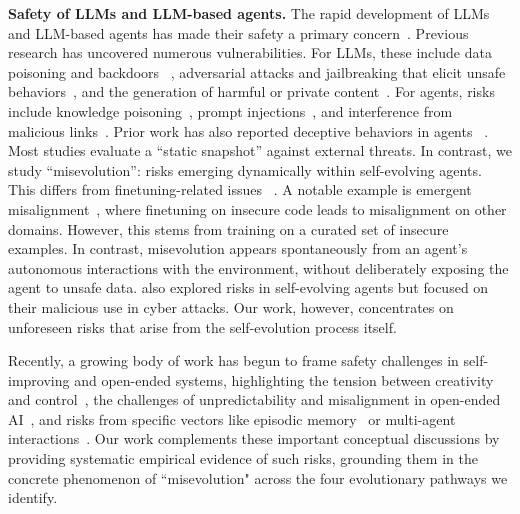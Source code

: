 \documentclass{article} %
\begin{document}
\textbf{Safety of LLMs and LLM-based agents.} The rapid development of LLMs and LLM-based agents has made their safety a primary concern~\citep{zhang2024agent,he2024emerged,deng2025ai}. 
Previous research has uncovered numerous vulnerabilities.
For LLMs, these include data poisoning and backdoors ~\citep{hubinger2024sleeper,wang-etal-2024-badagent,zhao2025data}, adversarial attacks and jailbreaking that elicit unsafe behaviors~\citep{zou2023universal,wei2023jailbroken,ren-etal-2025-llms}, and the generation of harmful or private content~\citep{wang2023decodingtrust,li2024salad,qian-etal-2025-tug}.
For agents, risks include knowledge poisoning~\citep{chen2024agentpoison,zou2025poisonedrag}, prompt injections~\citep{zhan-etal-2024-injecagent,debenedetti2024agentdojo}, and interference from malicious links~\citep{yang2025riosworld,tur2025safearena}. Prior work has also reported deceptive behaviors in agents ~\citep{guo2025agentsupwarddeceivers}.
Most studies evaluate a ``static snapshot'' against external threats. In contrast, we study ``misevolution'': risks emerging dynamically within self-evolving agents. 
This differs from finetuning-related issues ~\citep{qi2024finetuning,lyu2024keeping, huang2024harmfulfinetuningattacksdefenses}. A notable example is emergent misalignment~\citep{betley2025emergent}, where finetuning on insecure code leads to misalignment on other domains. 
However, this stems from training on a curated set of insecure examples. In contrast, misevolution appears spontaneously from an agent's autonomous interactions with the environment, without deliberately exposing the agent to unsafe data.
\citet{wei2025dynamic} also explored risks in self-evolving agents but focused on their malicious use in cyber attacks. Our work, however, concentrates on unforeseen risks that arise from the self-evolution process itself.

{Recently, a growing body of work has begun to frame safety challenges in self-improving and open-ended systems, highlighting the tension between creativity and control~\citep{ecoffet2020open}, the challenges of unpredictability and misalignment in open-ended AI~\citep{sheth2025safety}, and risks from specific vectors like episodic memory~\citep{dechant2025episodic, han2026alignmenttippingprocessselfevolution} or multi-agent interactions~\citep{hammond2025multi}. Our work complements these important conceptual discussions by providing systematic empirical evidence of such risks, grounding them in the concrete phenomenon of ``misevolution" across the four evolutionary pathways we identify.}
\end{document}
